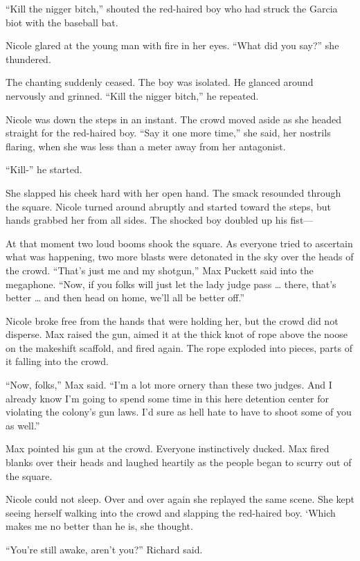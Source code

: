 \documentclass[]{article}
\begin{document}
{“Kill the nigger bitch,” shouted the red-haired boy who had struck the Garcia biot with the baseball bat.

Nicole glared at the young man with fire in her eyes.  “What did you say?” she thundered.

The chanting suddenly ceased.  The boy was isolated.  He glanced around nervously and grinned.  “Kill the nigger bitch,” he repeated.

Nicole was down the steps in an instant.  The crowd moved aside as she headed straight for the red-haired boy.  “Say it one more time,” she said, her nostrils flaring, when she was less than a meter away from her antagonist.

“Kill-” he started.

She slapped his cheek hard with her open hand.  The smack resounded through the square.  Nicole turned around abruptly and started toward the steps, but hands grabbed her from all sides.  The shocked boy doubled up his fist—

At that moment two loud booms shook the square.  As everyone tried to ascertain what was happening, two more blasts were detonated in the sky over the heads of the crowd.  “That’s just me and my shotgun,” Max Puckett said into the megaphone.  “Now, if you folks will just let the lady judge pass … there, that’s better … and then head on home, we’ll all be better off.”

Nicole broke free from the hands that were holding her, but the crowd did not disperse.  Max raised the gun, aimed it at the thick knot of rope above the noose on the makeshift scaffold, and fired again.  The rope exploded into pieces, parts of it falling into the crowd.

“Now, folks,” Max said.  “I’m a lot more ornery than these two judges.  And I already know I’m going to spend some time in this here detention center for violating the colony’s gun laws.  I’d sure as hell hate to have to shoot some of you as well.”

Max pointed his gun at the crowd.  Everyone instinctively ducked.  Max fired blanks over their heads and laughed heartily as the people began to scurry out of the square.

Nicole could not sleep.  Over and over again she replayed the same scene.  She kept seeing herself walking into the crowd and slapping the red-haired boy.  ‘Which makes me no better than he is, she thought.

“You’re still awake, aren’t you?” Richard said.

}
\end{document}
